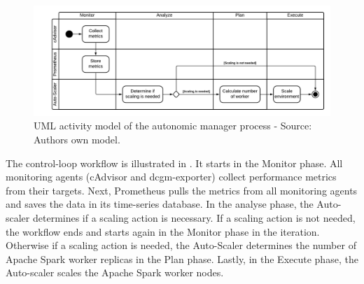 \paragraph{}
\begin{figure}[h]
\centering
\includegraphics[scale=0.50]{images/05_conceptual_design/autonomic_manager/autonomic_manager_workflow}
\caption{UML activity model of the autonomic manager process - Source: Authors own model.}
\label{fig:05_am_monitoring_loop_workflow}
\end{figure}
The control-loop workflow is illustrated in .
It starts in the Monitor phase. All monitoring agents (cAdvisor and dcgm-exporter) collect performance metrics from their targets. Next, Prometheus pulls the metrics from all monitoring agents and saves the data in its time-series database.
In the analyse phase, the Auto-scaler determines if a scaling action is necessary. If a scaling action is not needed, the workflow ends and starts again in the Monitor phase in the iteration.
Otherwise if a scaling action is needed, the Auto-Scaler determines the number of Apache Spark worker replicas in the Plan phase.
Lastly, in the Execute phase, the Auto-scaler scales the Apache Spark worker nodes.
